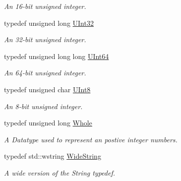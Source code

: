 \begin{DoxyCompactItemize}
\begin{DoxyCompactList}\small\item\em An 16-\/bit unsigned integer. \item\end{DoxyCompactList}\item 
\hypertarget{namespaceMezzanine_abea3b8e8e9b03d2547b2800284ba682d}{
typedef unsigned long \hyperlink{namespaceMezzanine_abea3b8e8e9b03d2547b2800284ba682d}{UInt32}}
\label{namespaceMezzanine_abea3b8e8e9b03d2547b2800284ba682d}

\begin{DoxyCompactList}\small\item\em An 32-\/bit unsigned integer. \item\end{DoxyCompactList}\item 
\hypertarget{namespaceMezzanine_ac690bcdbbe92a684875c5e8b16a33097}{
typedef unsigned long long \hyperlink{namespaceMezzanine_ac690bcdbbe92a684875c5e8b16a33097}{UInt64}}
\label{namespaceMezzanine_ac690bcdbbe92a684875c5e8b16a33097}

\begin{DoxyCompactList}\small\item\em An 64-\/bit unsigned integer. \item\end{DoxyCompactList}\item 
\hypertarget{namespaceMezzanine_aa5f38583d9025e05fa33d6e32e97b457}{
typedef unsigned char \hyperlink{namespaceMezzanine_aa5f38583d9025e05fa33d6e32e97b457}{UInt8}}
\label{namespaceMezzanine_aa5f38583d9025e05fa33d6e32e97b457}

\begin{DoxyCompactList}\small\item\em An 8-\/bit unsigned integer. \item\end{DoxyCompactList}\item 
typedef unsigned long \hyperlink{namespaceMezzanine_adcbb6ce6d1eb4379d109e51171e2e493}{Whole}
\begin{DoxyCompactList}\small\item\em A Datatype used to represent an postive integer numbers. \item\end{DoxyCompactList}\item 
typedef std::wstring \hyperlink{namespaceMezzanine_a08b3adb0d2632e4f6a454fdf3cf5efda}{WideString}
\begin{DoxyCompactList}\small\item\em A wide version of the String typedef. \item\end{DoxyCompactList}\end{DoxyCompactItemize}
